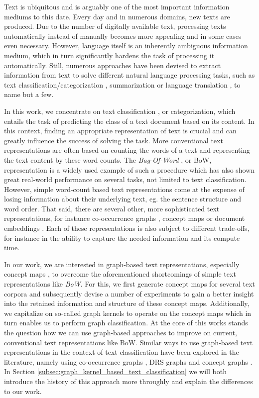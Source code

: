 Text is ubiquitous and is arguably one of the most important information mediums  to this date.
Every day and in numerous domains, new texts are produced.
Due to the number of digitally available text, processing texts automatically instead of manually becomes more appealing and in some cases even necessary.
However, language itself is an inherently ambiguous information medium, which in turn significantly hardens the task of processing it automatically.
Still, numerous approaches have been devised to extract information from text to solve different natural language processing tasks, such as text classification/categorization \cite[p.~575]{Manning2000}, summarization \cite{Mani1999} or language translation \cite{Weaver1955}, to name but a few.

In this work, we concentrate on text classification \cite[p.~232]{Manning2000}, or categorization, which entails the task of predicting the class of a text document based on its content.
In this context, finding an appropriate representation of text is crucial and can greatly influence the success of solving the task.
More conventional text representations are often based on counting the words of a text and representing the text content by these word counts.
The \textit{Bag-Of-Word} \cite[p.~237]{Manning2000}, or BoW, representation is a widely used example of such a procedure which has also shown great real-world performance on several tasks, not limited to text classification.
However, simple word-count based text representations come at the expense of losing information about their underlying text, eg. the sentence structure and word order.
That said, there are several other, more sophisticated text representations, for instance co-occurrence graphs \cite{Rousseau2013}, concept maps \cite{Novak2008,Falke2017b} or document embeddings \cite{Dai2015,Lau2016}.
Each of these representations is also subject to different trade-offs, for instance in the ability to capture the needed information and its compute time.

In our work, we are interested in graph-based text representations, especially concept maps \cite{Novak2008,Falke2017b}, to overcome the aforementioned shortcomings of simple text representations like \textit{BoW}.
For this, we first generate concept maps for several text corpora and subsequently devise a number of experiments to gain a better insight into the retained information and structure of these concept maps.
Additionally, we capitalize on so-called graph kernels \cite{Kulharia2008} to operate on the concept maps which in turn enables us to perform graph classification.
At the core of this works stands the question how we can use graph-based approaches to improve on current, conventional text representations like BoW.
Similar ways to use graph-based text representations in the context of text classification have been explored in the literature, namely using co-occurrence graphs \cite{Rousseau2015a, Nikolentzos2017a}, DRS graphs \cite{Gaspar2011} and concept graphs \cite{Gulrandhe2015}.
In Section \ref{subsec:graph_kernel_based_text_classification} we will both introduce the history of this approach more throughly and explain the differences to our work.

